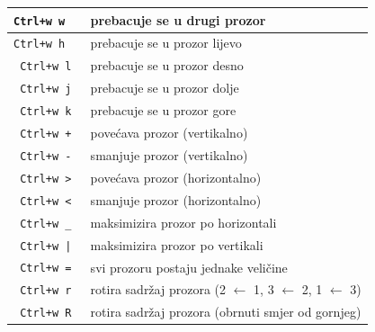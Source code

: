 \documentclass[10pt]{article}
\begin{document}
    \begin{tabular}{|>{\tt}p{9.00cm}|>{}p{15.50cm}|}
        \hline
        Ctrl+w w                                    & prebacuje se u drugi prozor                                                   \\ \hline
        Ctrl+w h                                    & prebacuje se u prozor lijevo                                                  \\ \hline
        Ctrl+w l                                    & prebacuje se u prozor desno                                                   \\ \hline
        Ctrl+w j                                    & prebacuje se u prozor dolje                                                   \\ \hline
        Ctrl+w k                                    & prebacuje se u prozor gore                                                    \\ \hline \hline
        Ctrl+w +                                    & povećava prozor (vertikalno)                                                  \\ \hline
        Ctrl+w -                                    & smanjuje prozor (vertikalno)                                                  \\ \hline
        Ctrl+w >                                    & povećava prozor (horizontalno)                                                \\ \hline
        Ctrl+w <                                    & smanjuje prozor (horizontalno)                                                \\ \hline
        Ctrl+w \_                                   & maksimizira prozor po horizontali                                             \\ \hline
        Ctrl+w |                                    & maksimizira prozor po vertikali                                               \\ \hline
        Ctrl+w =                                    & svi prozoru postaju jednake veličine                                          \\ \hline \hline
        Ctrl+w r                                    & rotira sadržaj prozora (2 $\leftarrow$ 1, 3 $\leftarrow$ 2, 1 $\leftarrow$ 3) \\ \hline
        Ctrl+w R                                    & rotira sadržaj prozora (obrnuti smjer od gornjeg)                             \\ \hline

\end{tabular}
\end{document}
